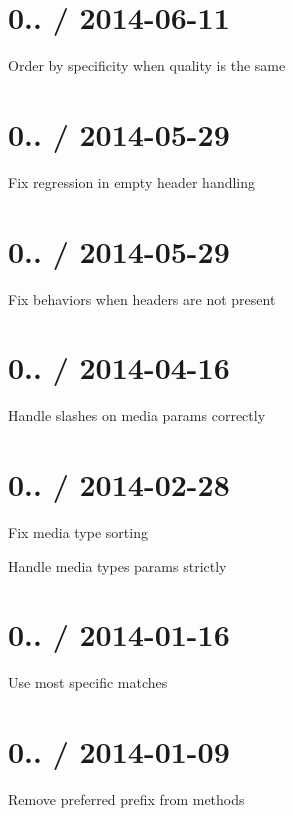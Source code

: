 \section*{0.. / 2014-\/06-\/11 }


\begin{DoxyItemize}
\item Order by specificity when quality is the same
\end{DoxyItemize}

\section*{0.. / 2014-\/05-\/29 }


\begin{DoxyItemize}
\item Fix regression in empty header handling
\end{DoxyItemize}

\section*{0.. / 2014-\/05-\/29 }


\begin{DoxyItemize}
\item Fix behaviors when headers are not present
\end{DoxyItemize}

\section*{0.. / 2014-\/04-\/16 }


\begin{DoxyItemize}
\item Handle slashes on media params correctly
\end{DoxyItemize}

\section*{0.. / 2014-\/02-\/28 }


\begin{DoxyItemize}
\item Fix media type sorting
\item Handle media types params strictly
\end{DoxyItemize}

\section*{0.. / 2014-\/01-\/16 }


\begin{DoxyItemize}
\item Use most specific matches
\end{DoxyItemize}

\section*{0.. / 2014-\/01-\/09 }


\begin{DoxyItemize}
\item Remove preferred prefix from methods 
\end{DoxyItemize}